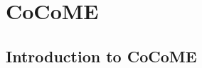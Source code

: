 \chapter{CoCoME}
\label{ch:CoCoME}

\section{Introduction to CoCoME}
\label{sec:CoCoME:Introduction}

\cite{mittelbach2014}